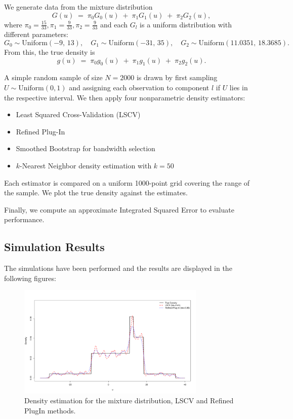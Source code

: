 \documentclass{article}
\begin{document}
We generate data from the mixture distribution 
\[
  G(u) \;=\; \pi_{0} G_{0}(u) \;+\; \pi_{1} G_{1}(u) \;+\; \pi_{2} G_{2}(u),
\]
where \(\pi_{0} = \tfrac{15}{33}, \pi_{1} = \tfrac{9}{33}, \pi_{2} = \tfrac{9}{33}\) and each \(G_{l}\) is a uniform distribution with different parameters:
\[
  G_{0} \sim \mathrm{Uniform}(-9,\,13), \quad
  G_{1} \sim \mathrm{Uniform}(-31,\,35), \quad
  G_{2} \sim \mathrm{Uniform}(11.0351,\,18.3685).
\]
From this, the true density is
\[
   g(u) \;=\; \pi_{0} g_{0}(u) \;+\; \pi_{1} g_{1}(u) \;+\; \pi_{2} g_{2}(u).
\]

A simple random sample of size \(N = 2000\) is drawn by first sampling \(U \sim \text{Uniform}(0, 1)\) and assigning each observation to component \(l\) if \(U\) lies in the respective interval. We then apply four nonparametric density estimators:

\begin{itemize}
  \item Least Squared Cross-Validation (LSCV)
  \item Refined Plug-In
  \item Smoothed Bootstrap for bandwidth selection
  \item \(k\)-Nearest Neighbor density estimation with \(k = 50\)
\end{itemize}

Each estimator is compared on a uniform 1000-point grid covering the range of the sample. We plot the true density against the estimates.

Finally, we compute an approximate Integrated Squared Error to evaluate performance.

\subsection{Simulation Results}

The simulations have been performed and the results are displayed in the following figures:

\begin{figure}[H]
  \centering
  \includegraphics[width=0.8\textwidth]{density_estimation_comparison_p1.png}
  \caption{Density estimation for the mixture distribution, LSCV and Refined Plug\-In methods.}
\end{figure}
\end{document}
